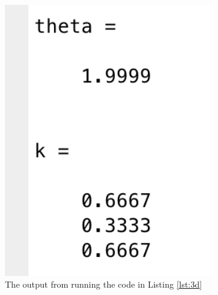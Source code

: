 \documentclass{article}
\begin{document}
\begin{figure}[H]
    \centering
    \includegraphics[width = 0.8\textwidth]{ktheta}
    \caption{The output from running the code in Listing \ref{lst:3d}}
\end{figure}


\end{document}
